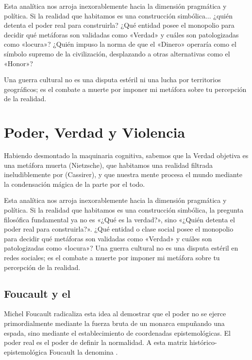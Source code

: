 Esta analítica nos arroja inexorablemente hacia la dimensión pragmática y política. Si la realidad que habitamos es una construcción simbólica... ¿quién detenta el poder real para construirla?  ¿Qué entidad posee el monopolio para decidir qué metáforas son validadas como «Verdad» y cuáles son patologizadas como «locura»?  ¿Quién impuso la norma de que el «Dinero» operaría como el símbolo supremo de la civilización, desplazando a otras alternativas como el «Honor»?  

Una guerra cultural no es una disputa estéril ni una lucha por territorios geográficos; es el combate a muerte por imponer mi metáfora sobre tu percepción de la realidad.

\section{Poder, Verdad y Violencia}

Habiendo desmontado la maquinaria cognitiva, sabemos que la Verdad objetiva es una metáfora muerta (Nietzsche), que habitamos una realidad filtrada ineludiblemente por \FormasSimbolicas{} (Cassirer), y que nuestra mente procesa el mundo mediante la condensación mágica de la parte por el todo. 

Esta analítica nos arroja inexorablemente hacia la dimensión pragmática y política. Si la realidad que habitamos es una construcción simbólica, la pregunta filosófica fundamental ya no es «¿Qué es la verdad?», sino «¿Quién detenta el poder real para construirla?». ¿Qué entidad o clase social posee el monopolio para decidir qué metáforas son validadas como «Verdad» y cuáles son patologizadas como «locura»? Una guerra cultural no es una disputa estéril en redes sociales; es el combate a muerte por imponer mi metáfora sobre tu percepción de la realidad.

\subsection{Foucault y el \RegimenVerdad}

Michel Foucault radicaliza esta idea al demostrar que el poder no se ejerce primordialmente mediante la fuerza bruta de un monarca empuñando una espada, sino mediante el establecimiento de coordenadas epistemológicas. El poder real es el poder de definir la normalidad. A esta matriz histórico-epistemológica Foucault la denomina \textbf{\RegimenVerdad}.

